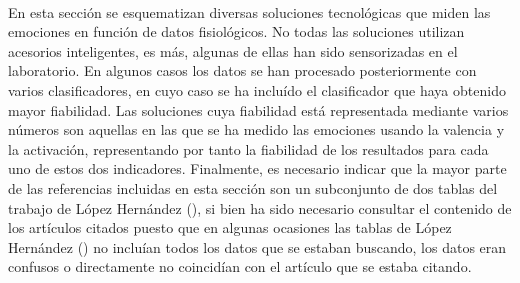 \paragraph{}
En esta sección se esquematizan diversas soluciones tecnológicas que miden las emociones en función de datos fisiológicos. No todas las soluciones utilizan acesorios inteligentes, es más, algunas de ellas han sido sensorizadas en el laboratorio. En algunos casos los datos se han procesado posteriormente con varios clasificadores, en cuyo caso se ha incluído el clasificador que haya obtenido mayor fiabilidad. Las soluciones cuya fiabilidad está representada mediante varios números son aquellas en las que se ha medido las emociones usando la valencia y la activación, representando por tanto la fiabilidad de los resultados para cada uno de estos dos indicadores. Finalmente, es necesario indicar que la mayor parte de las referencias incluidas en esta sección son un subconjunto de dos tablas del trabajo de López Hernández (\citeyear{hernandez2016clasificacion}), si bien ha sido necesario consultar el contenido de los artículos citados puesto que en algunas ocasiones las tablas de López Hernández (\citeyear{hernandez2016clasificacion}) no incluían todos los datos que se estaban buscando, los datos eran confusos o directamente no coincidían con el artículo que se estaba citando.

